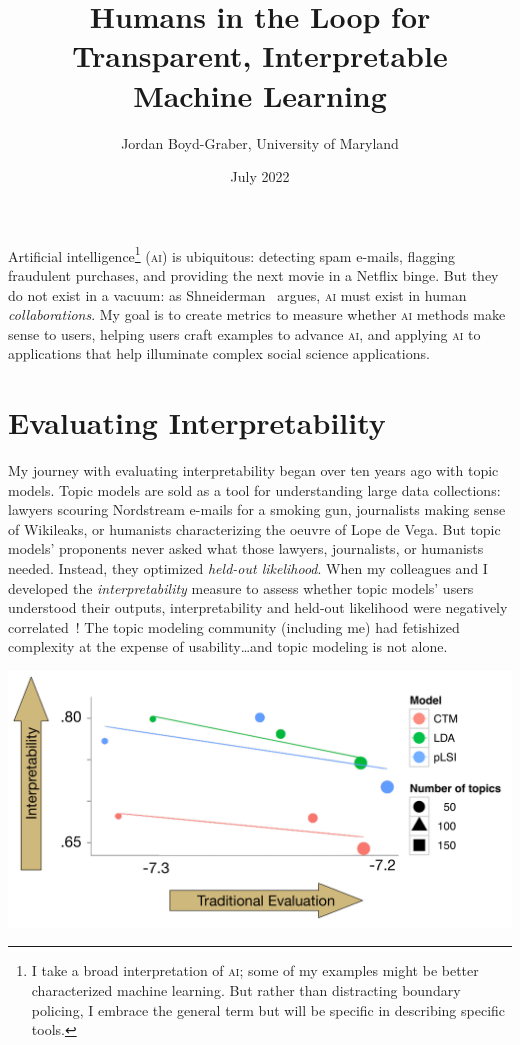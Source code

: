 \documentclass[11pt]{amsart}
\newcommand{\abr}[1]{\textsc{#1}}
\begin{document}
 \title{Humans in the Loop for Transparent, Interpretable Machine Learning}

 \author{Jordan Boyd-Graber, University of Maryland}


\date{July 2022}

\maketitle

Artificial intelligence\footnote{I take a broad interpretation of
\abr{ai}; some of my examples might be better characterized machine
learning.  But rather than distracting boundary policing, I embrace
the general term but will be specific in describing specific tools.}
(\abr{ai}) is ubiquitous: detecting spam e-mails, flagging fraudulent
purchases, and providing the next movie in a Netflix binge.
%
But they do not exist in a vacuum: as
Shneiderman~\cite{shneiderman-21} argues, \abr{ai} must exist
in human \emph{collaborations}.
%
My goal is to create metrics to measure whether \abr{ai} methods make
sense to users, helping users craft examples to advance \abr{ai}, and
applying \abr{ai} to applications that help illuminate complex social
science applications.

\section{Evaluating Interpretability}

My journey with evaluating interpretability began over ten years ago
with topic models.
%
Topic models are sold as a tool for understanding large data
collections: lawyers scouring Nordstream e-mails for a smoking gun,
journalists making sense of Wikileaks, or humanists characterizing the
oeuvre of Lope de Vega.
%
But topic models' proponents never asked what those lawyers,
journalists, or humanists needed.
%
Instead, they optimized \emph{held-out likelihood}. When my colleagues
and I developed the \emph{interpretability} measure to assess whether topic
models' users understood their outputs, interpretability and
held-out likelihood were negatively correlated~\cite{chang-09b}!
%
The topic modeling community (including me) had fetishized complexity
at the expense of usability\dots and topic modeling is not alone.

\begin{center}
\includegraphics[width=.5\linewidth]{images/prec_ll_4}
\end{center}
\end{document}
